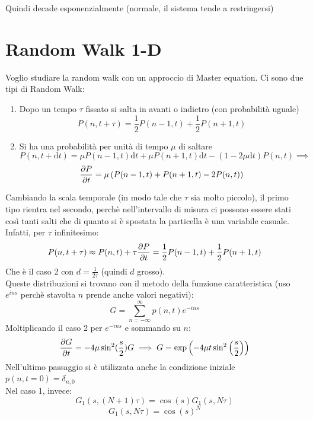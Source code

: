 \documentclass[a4paper,12pt]{article}
\theoremstyle{plain}
\theoremstyle{definition}
\newcommand{\f}[2]{\frac{#1}{#2}}
\renewcommand{\d}{\text{d}}
\theoremstyle{remark}
\begin{document}
Quindi decade esponenzialmente (normale, il sistema tende a restringersi)

\section{Random Walk 1-D}
Voglio studiare la random walk con un approccio di Master equation. Ci sono due tipi di Random Walk: 
\begin{enumerate}
\item Dopo un tempo $\tau$ fissato si salta in avanti o indietro (con probabilità uguale)
\[P(n,t+\tau)=\f{1}{2}	P(n-1,t)+\f{1}{2}	P(n+1,t)	\]
\item
Si ha una probabilità per unità di tempo $\mu$ di saltare	\label{due}
\[			P(n, t+\d t)= \mu P(n-1,t) \d t+\mu P(n+1,t)\d t- (1-2\mu\d t)P(n,t)\implies\]\[ \pdv{P}{t}=\mu \left(P(n-1,t)+ P(n+1,t)-2 P(n,t)\right)\]
\end{enumerate} Cambiando la scala temporale (in modo tale che $\tau$ sia molto piccolo), il primo tipo rientra nel secondo, perchè nell'intervallo di misura ci possono essere stati così tanti salti che di quanto si è spostata la particella è una variabile casuale.
\\Infatti, per $\tau $ infinitesimo:
\[P(n,t+\tau)\approx P(n,t)+\tau \pdv{P}{t}	=\f{1}{2}	P(n-1,t)+\f{1}{2}	P(n+1,t)	\]
Che è il caso 2 con $d=\f{1}{2\tau}$ (quindi $d$ grosso).\\
Queste distribuzioni si trovano con il metodo della funzione caratteristica (uso $e^{ins}$ perchè stavolta $n$ prende anche valori negativi):
\[G=\sum_{n=-\infty}^\infty  p(n,t)e^{-ins}\]
Moltiplicando il caso 2 per $e^{-ins}$ e sommando su $n$:
\[\pdv{G}{t}=-4\mu \sin^2(\f{s}{2})G\implies G=\exp\left(-4\mu t\sin ^2 \left(\f{s}{2}\right)			\right)		\]
Nell'ultimo passaggio si è utilizzata anche la condizione iniziale $p(n,t=0)=\delta_{n,0}$
\\
Nel caso 1, invece:
\[G_1(s, (N+1)\tau)=\cos(s)G_1(s,N \tau)			\]
\[G_1(s, N\tau)=\cos(s)^N\]
\end{document}
